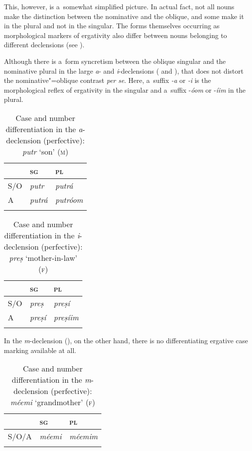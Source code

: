 This, however, is a~somewhat simplified picture. In actual fact, not all nouns make the distinction between the nominative and the oblique, and some make it in the plural and not in the singular. The forms themselves occurring as morphological markers of ergativity also differ between nouns belonging to different declensions (see ). 


Although there is a~form syncretism between the oblique singular and the nominative plural in the large \textit{a}- and \textit{i}-declensions ( and ), that does not distort the nominative"=oblique contrast \textit{per se}. Here, a~suffix \textit{-a} or \textit{-i} is the morphological reflex of ergativity in the singular and a~suffix -\textit{óom} or -\textit{íim} in the plural. 


\begin{table}[ht]
\caption{Case and number differentiation in the \textit{a}-declension (perfective): \textit{putr} `son' \textsc{(m)}} 
\begin{tabularx}{\textwidth}{ Q Q Q }
\lsptoprule
&
\textsc{sg} &
\textsc{pl}\\\hline
S/O &
\textit{putr} &
\textit{putrá} \\
A &
\textit{putrá} &
\textit{putróom}\\\lspbottomrule
\end{tabularx}
\label{tab:11-adecl}
\end{table}


\begin{table}[ht]
\caption{Case and number differentiation in the \textit{i}-declension (perfective): \textit{preṣ} `mother-in-law' \textsc{(f)}}
\begin{tabularx}{\textwidth}{ Q Q Q }
\lsptoprule
&
\textsc{sg} &
\textsc{pl}\\\hline
S/O &
\textit{preṣ} &
\textit{preṣí} \\
A &
\textit{preṣí} &
\textit{preṣíim} \\\lspbottomrule
\end{tabularx}
\label{tab:11-idecl}
\end{table}


In the \textit{m}-declension (), on the other hand, there is no differentiating ergative case marking available at all. 


\begin{table}[ht]
\caption{Case and number differentiation in the \textit{m}-declension (perfective): \textit{méemi} `grandmother' \textsc{(f)}}
\begin{tabularx}{\textwidth}{ Q Q Q }
\lsptoprule
&
\textsc{sg} &
\textsc{pl}\\\hline
S/O/A &
\textit{méemi} &
\textit{méemim} \\\lspbottomrule
\end{tabularx}
\label{tab:11-mdecl}
\end{table}


